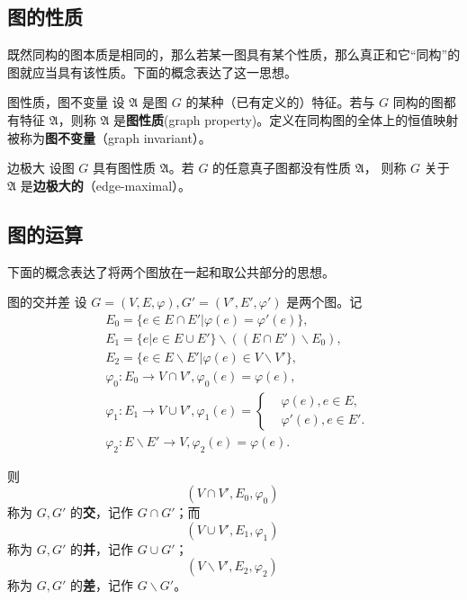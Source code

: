 \subsection{图的性质}
既然同构的图本质是相同的，那么若某一图具有某个性质，那么真正和它“同构”的图就应当具有该性质。下面的概念表达了这一思想。
\begin{definition}{图性质，图不变量}
设 $\mathfrak A$ 是图 $G$ 的某种（已有定义的）特征。若与 $G$ 同构的图都有特征 $\mathfrak A$，则称 $\mathfrak A$ 是\textbf{图性质}(graph property)。定义在同构图的全体上的恒值映射被称为\textbf{图不变量}（graph invariant）。
\end{definition}

\begin{definition}{边极大}
设图 $G$ 具有图性质 $\mathfrak A$。若 $G$ 的任意真子图都没有性质 $\mathfrak A$， 则称 $G$ 关于  $\mathfrak A$ 是\textbf{边极大的}（edge-maximal）。
\end{definition}

\subsection{图的运算}
下面的概念表达了将两个图放在一起和取公共部分的思想。

\begin{definition}{图的交并差}
设 $G=(V,E,\varphi),G'=(V',E',\varphi')$ 是两个图。记
\begin{equation}
\begin{aligned}
&E_0=\{e\in E\cap E'|\varphi(e)=\varphi'(e)\},\\
&E_1=\{e|e\in E\cup E'\}\backslash ((E\cap E')\backslash E_0),\\
&E_2=\{e\in E\backslash E'|\varphi(e)\in V\backslash V'\},\\
&\varphi_0:E_0\rightarrow V\cap V',\varphi_0(e)=\varphi(e),\\
&\varphi_1:E_1\rightarrow V\cup V',\varphi_1(e)=\left\{\begin{aligned}
&\varphi(e),e\in E,\\
&\varphi'(e),e\in E'.
\end{aligned}\right. \\
&\varphi_2:E\backslash E'\rightarrow V,\varphi_2(e)=\varphi(e).
\end{aligned}
~
\end{equation}

则
\begin{equation}
(V\cap V',E_0,\varphi_0)~
\end{equation}
称为 $G,G'$ 的\textbf{交}，记作 $G\cap G'$；而
\begin{equation}
(V\cup V',E_1,\varphi_1)~
\end{equation}
称为 $G,G'$ 的\textbf{并}，记作 $G\cup G'$；
\begin{equation}
(V\backslash V',E_2,\varphi_2)~
\end{equation}
称为 $G,G'$ 的\textbf{差}，记作 $G\backslash G'$。
\end{definition}


